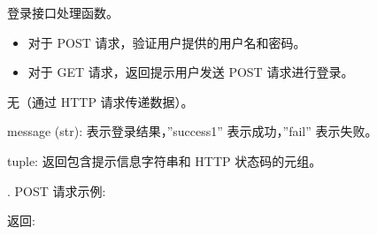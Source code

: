 \documentclass[a4paper,12pt,english]{sphinxmanual}
\begin{document}
\begin{fulllineitems}
\label{\detokenize{api/login:login.login}}
\pysigstartsignatures
{}
\pysigstopsignatures
\sphinxAtStartPar
登录接口处理函数。
\begin{description}
\begin{itemize}
\item {} 
\sphinxAtStartPar
对于 POST 请求，验证用户提供的用户名和密码。

\item {} 
\sphinxAtStartPar
对于 GET 请求，返回提示用户发送 POST 请求进行登录。

\end{itemize}

\sphinxAtStartPar
无（通过 HTTP 请求传递数据）。

\begin{description}
\begin{description}
\sphinxAtStartPar
message (str): 表示登录结果，”success1” 表示成功，”fail” 表示失败。

\end{description}

\sphinxAtStartPar
tuple: 返回包含提示信息字符串和 HTTP 状态码的元组。

\end{description}

. POST 请求示例:

\begin{sphinxVerbatim}[commandchars=\\\{\}]
 
     
     
\end{sphinxVerbatim}

\sphinxAtStartPar
返回:

\begin{sphinxVerbatim}[commandchars=\\\{\}]
     
\end{sphinxVerbatim}


\end{description}
\end{fulllineitems}
\end{document}
